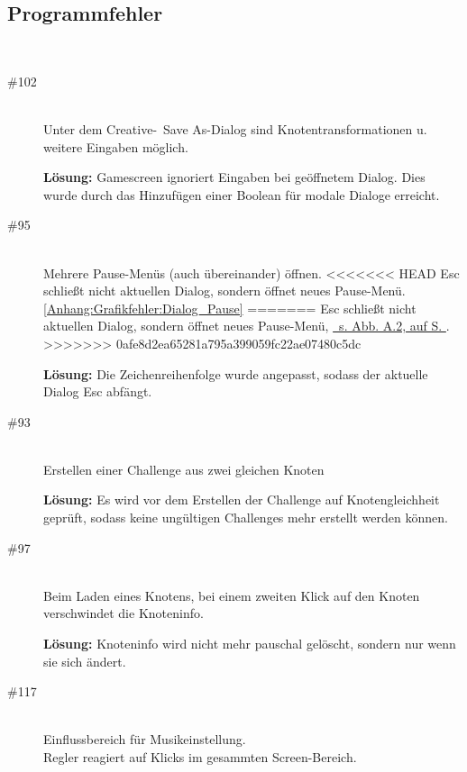 %



\subsection*{Programmfehler}


~\\
\begin{description}

\item[\#102] \hfill \\
Unter dem Creative-\glqq~Save As\grqq-Dialog sind Knotentransformationen u. weitere Eingaben möglich.

{\bfseries Lösung:} Gamescreen ignoriert Eingaben bei geöffnetem Dialog. Dies wurde durch das Hinzufügen einer Boolean für modale Dialoge erreicht. 


\item[\#95] \hfill \\
Mehrere Pause-Menüs (auch übereinander) öffnen.
<<<<<<< HEAD
Esc schließt nicht aktuellen Dialog, sondern öffnet neues Pause-Menü. \ref{Anhang:Grafikfehler:Dialog_Pause}
=======
Esc schließt nicht aktuellen Dialog, sondern öffnet neues Pause-Menü, \hyperref[Anhang:Grafikfehler:Dialog_Pause]{\mousecursor~s. Abb. A.2, auf S. \pageref{Anhang:Grafikfehler:Dialog_Pause}}.
>>>>>>> 0afe8d2ea65281a795a399059fc22ae07480c5dc

{\bfseries Lösung:} Die Zeichenreihenfolge wurde angepasst, sodass der aktuelle Dialog Esc abfängt.


\item[\#93] \hfill \\
Erstellen einer Challenge aus zwei gleichen Knoten

{\bfseries Lösung:}  Es wird vor dem Erstellen der Challenge auf Knotengleichheit geprüft, sodass keine ungültigen Challenges mehr erstellt werden können.


\item[\#97] \hfill \\
Beim Laden eines Knotens, bei einem zweiten Klick auf den Knoten verschwindet die Knoteninfo.

{\bfseries Lösung:} Knoteninfo wird nicht mehr pauschal gelöscht, sondern nur wenn sie sich ändert. 


\item[\#117] \hfill \\
Einflussbereich für Musikeinstellung. \\
Regler reagiert auf Klicks im gesammten Screen-Bereich.


\end{description}
